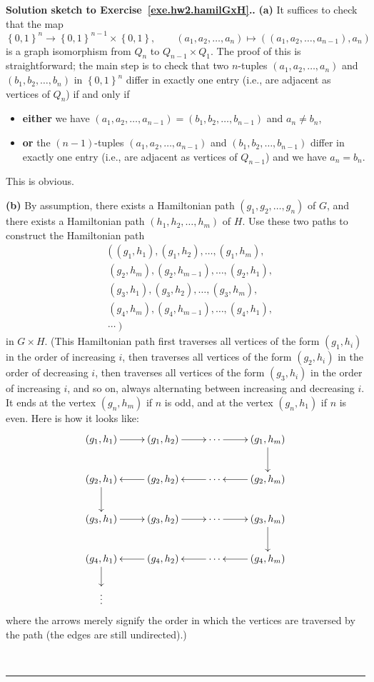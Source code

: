 \documentclass[numbers=enddot,12pt,final,onecolumn,notitlepage]{scrartcl}%
\theoremstyle{definition}
\newenvironment{proof}[1][Proof]{\noindent\textbf{#1.} }{\ \rule{0.5em}{0.5em}}
\newcommand{\set}[1]{\left\{ #1 \right\}}
\newcommand{\tup}[1]{\left( #1 \right)}
\begin{document}
\begin{proof}[Solution sketch to Exercise~\ref{exe.hw2.hamilGxH}.]
\textbf{(a)} It suffices to check that the map
\[
\set{0, 1}^n \to \set{0, 1}^{n-1} \times \set{0, 1}, \qquad
\tup{a_1, a_2, \ldots, a_n}
 \mapsto \tup{ \tup{a_1, a_2, \ldots, a_{n-1}}, a_n}
\]
is a graph isomorphism from $Q_n$ to $Q_{n-1} \times Q_1$. The proof
of this is straightforward; the main step is to check that two
$n$-tuples
$\tup{a_1, a_2, \ldots, a_n}$ and $\tup{b_1, b_2, \ldots, b_n}$ in
$\set{0, 1}^n$ differ in exactly one entry (i.e., are adjacent as
vertices of $Q_n$) if and only if
\begin{itemize}
\item \textbf{either} we have
$\tup{a_1, a_2, \ldots, a_{n-1}} = \tup{b_1, b_2, \ldots, b_{n-1}}$ 
and $a_n \neq b_n$,
\item \textbf{or} the $\tup{n-1}$-tuples
$\tup{a_1, a_2, \ldots, a_{n-1}}$ and
$\tup{b_1, b_2, \ldots, b_{n-1}}$ 
differ in exactly one entry (i.e., are adjacent as vertices of
$Q_{n-1}$) and we have $a_n = b_n$.
\end{itemize}
This is obvious.

\textbf{(b)} By assumption, there exists a Hamiltonian path
$\tup{g_1, g_2, \ldots, g_n}$ of $G$, and there exists a Hamiltonian
path $\tup{h_1, h_2, \ldots, h_m}$ of $H$. Use these two paths to
construct the Hamiltonian path
\begin{align}
& \left(
            \tup{g_1, h_1}, \tup{g_1, h_2}, \ldots, \tup{g_1, h_m}, \right. \nonumber \\
&    \left. \  \tup{g_2, h_m}, \tup{g_2, h_{m-1}}, \ldots, \tup{g_2, h_1}, \right. \nonumber \\
&    \left. \  \tup{g_3, h_1}, \tup{g_3, h_2}, \ldots, \tup{g_3, h_m}, \right. \nonumber \\
&    \left. \  \tup{g_4, h_m}, \tup{g_4, h_{m-1}}, \ldots, \tup{g_4, h_1}, \right. \nonumber \\
&    \left. \  \cdots \right)
    \label{sol.hw2.hamilGxH.1}
\end{align}
in $G \times H$. (This Hamiltonian path first traverses all vertices
of the form $\tup{g_1, h_i}$ in the order of increasing $i$, then
traverses all vertices of the form $\tup{g_2, h_i}$ in the order of
decreasing $i$, then traverses all vertices of the form
$\tup{g_3, h_i}$ in the order of increasing $i$, and so on, always
alternating between increasing and decreasing $i$. It ends at the
vertex $\tup{g_n, h_m}$ if $n$ is odd, and at the vertex
$\tup{g_n, h_1}$ if $n$ is even. Here is how it looks like:
\[
\xymatrix{
\tup{g_1, h_1} \ar[r] & \tup{g_1, h_2} \ar[r] & \cdots \ar[r] & \tup{g_1, h_m} \ar[d] \\
\tup{g_2, h_1} \ar[d] & \tup{g_2, h_2} \ar[l] & \cdots \ar[l] & \tup{g_2, h_m} \ar[l] \\
\tup{g_3, h_1} \ar[r] & \tup{g_3, h_2} \ar[r] & \cdots \ar[r] & \tup{g_3, h_m} \ar[d] \\
\tup{g_4, h_1} \ar[d] & \tup{g_4, h_2} \ar[l] & \cdots \ar[l] & \tup{g_4, h_m} \ar[l] \\
\vdots
}
\]
where the arrows merely signify the order in which the vertices are
traversed by the path (the edges are still undirected).)


\end{proof}
\end{document}
